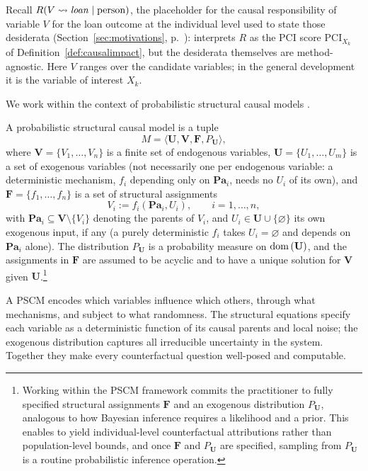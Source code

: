 Recall $R(V \rightsquigarrow \varname{loan} \mid \text{person})$, the placeholder for
the causal responsibility of variable $V$ for the loan outcome at the individual level
used to state those desiderata (Section~\ref{sec:motivations}, p.~\pageref{desid}):
\ourapproach interprets $R$ as the PCI score $\mathrm{PCI}_{X_k}$ of
Definition~\ref{def:causalimpact}, but the desiderata themselves are method-agnostic.
Here $V$ ranges over the candidate variables; in the general development
it is the variable of interest $X_k$.

We work within the context of probabilistic structural causal models \citep{causalityPearl}.
\begin{definition}
A probabilistic structural causal model is a tuple
\[
M = \langle \mathbf{U}, \mathbf{V}, \mathbf{F}, P_{\mathbf{U}} \rangle,
\]
where \(\mathbf{V} = \{V_1,\dots,V_n\}\) is a finite set of endogenous variables,
\(\mathbf{U} = \{U_1,\dots,U_m\}\) is a set of exogenous variables (not
necessarily one per endogenous variable: a deterministic mechanism, $f_i$
depending only on $\mathbf{Pa}_i$, needs no $U_i$ of its own),
and \(\mathbf{F} = \{f_1,\dots,f_n\}\) is a set of structural assignments
\[
V_i := f_i(\mathbf{Pa}_i, U_i), \qquad i = 1,\dots,n,
\]
with \(\mathbf{Pa}_i \subseteq \mathbf{V}\setminus\{V_i\}\) denoting the parents of \(V_i\), and
$U_i\in\mathbf{U}\cup\{\varnothing\}$ its own exogenous input, if any (a purely
deterministic $f_i$ takes $U_i=\varnothing$ and depends on $\mathbf{Pa}_i$ alone).
The distribution \(P_{\mathbf{U}}\) is a probability measure on $\operatorname{dom}\,(\mathbf{U})$,
and the assignments in \(\mathbf{F}\) are assumed to be acyclic and to have a unique solution for \(\mathbf{V}\) given \(\mathbf{U}\).\footnote{Working within the PSCM framework commits the practitioner to fully specified structural assignments $\mathbf{F}$ and an exogenous distribution $P_{\mathbf{U}}$, analogous to how Bayesian inference requires a likelihood and a prior. This enables \ourapproach to yield individual-level counterfactual attributions rather than population-level bounds, and once $\mathbf{F}$ and $P_{\mathbf{U}}$ are specified, sampling from $P_{\mathbf{U}}$ is a routine probabilistic inference operation.}
\end{definition}

\medskip\noindent A PSCM encodes which variables influence which others, 
through what mechanisms, and subject to what randomness. The structural equations specify
 each variable as a deterministic function of its causal parents and local noise; the exogenous 
 distribution captures all irreducible uncertainty in the system. Together they make every counterfactual
  question well-posed and computable.


